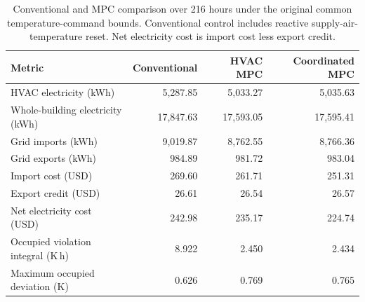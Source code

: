 \begin{table}[htbp]
\centering\small
\caption{Conventional and MPC comparison over 216 hours under the original common temperature-command bounds. Conventional control includes reactive supply-air-temperature reset. Net electricity cost is import cost less export credit.}
\label{tab:matched-control-original}
\begin{tabular}{@{}lrrr@{}}
\toprule
Metric & Conventional & HVAC MPC & Coordinated MPC \\
\midrule
HVAC electricity (kWh) & 5,287.85 & 5,033.27 & 5,035.63 \\
Whole-building electricity (kWh) & 17,847.63 & 17,593.05 & 17,595.41 \\
Grid imports (kWh) & 9,019.87 & 8,762.55 & 8,766.36 \\
Grid exports (kWh) & 984.89 & 981.72 & 983.04 \\
Import cost (USD) & 269.60 & 261.71 & 251.31 \\
Export credit (USD) & 26.61 & 26.54 & 26.57 \\
Net electricity cost (USD) & 242.98 & 235.17 & 224.74 \\
Occupied violation integral (K\,h) & 8.922 & 2.450 & 2.434 \\
Maximum occupied deviation (K) & 0.626 & 0.769 & 0.765 \\
\bottomrule
\end{tabular}
\end{table}
